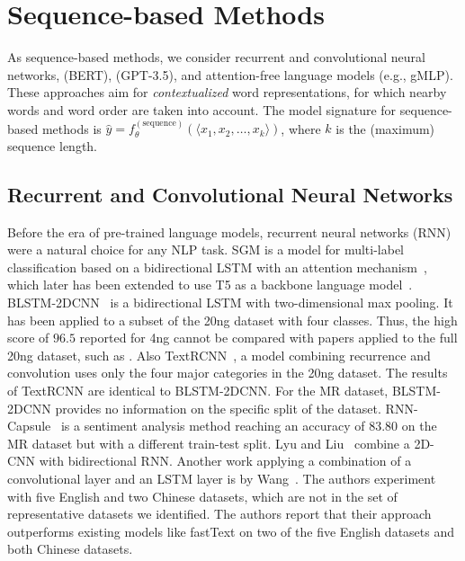 \section{Sequence-based Methods}\label{sec:sequence}
As sequence-based methods, we consider recurrent and convolutional neural networks, \SLMs (\eg BERT), \LLMs (\eg GPT-3.5), and attention-free language models (e.g., gMLP). 
These approaches aim for \emph{contextualized} word representations, for which nearby words and word order are taken into account.
The model signature for sequence-based methods is
$\hat{y} = f_\theta^{(\mathrm{sequence})} ( \langle x_1, x_2, \ldots, x_k \rangle )$,
where $k$ is the (maximum) sequence length.

\subsection{Recurrent and Convolutional Neural Networks}

Before the era of pre-trained language models, recurrent neural networks (RNN) were a natural choice for any NLP task.
SGM is a model for multi-label classification based on a bidirectional LSTM with an attention mechanism~\cite{sgm}, which later has been extended to use T5 as a backbone language model~\cite{seq2tree}.
BLSTM-2DCNN~\cite{DBLP:conf/coling/ZhouQZXBX16} is a bidirectional LSTM with two-dimensional max pooling.
It has been applied to a subset of the 20ng dataset with four classes. 
Thus, the high score of $96.5$ reported for 4ng cannot be compared with papers applied to the full 20ng dataset, such as \cite{galkescherp-acl2022}.
Also Text\-RCNN~\cite{DBLP:conf/aaai/LaiXLZ15}, a model combining recurrence and convolution 
uses only the four major categories in the 20ng dataset. 
The results of Text\-RCNN are identical to BLSTM-2DCNN.
For the MR dataset, BLSTM-2DCNN provides no information on the specific split of the dataset.
RNN-Capsule~\cite{DBLP:conf/www/WangSH0Z18} is a sentiment analysis method reaching
an accuracy of $83.80$ on the MR dataset but with a different train-test split.
Lyu and Liu~\cite{DBLP:journals/corr/abs-2006-15795} combine a 2D-CNN with bidirectional RNN.
Another work applying a combination of a convolutional layer and an LSTM layer is by Wang~\etal\cite{DBLP:conf/ijcnn/WangLCCW19}. 
The authors experiment with five English and two Chinese datasets, which are not in the set of representative datasets we identified.
The authors report that their approach outperforms existing models like fastText on two of the five English datasets and both Chinese datasets. 

